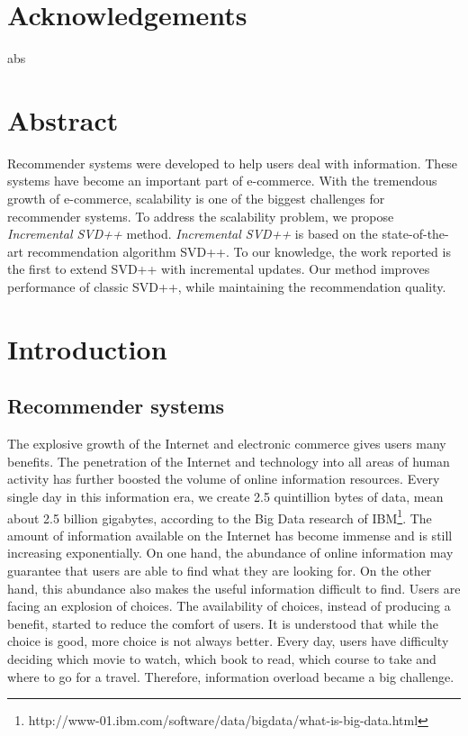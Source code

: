 \documentclass[oneside,13pt]{extreport}
\begin{document}
\clearpage
%
\chapter*{Acknowledgements}
\renewcommand{\thepage}{\roman{page}}
\setcounter{page}{1}

abs

\renewcommand\contentsname{Table of contents}
\tableofcontents
\clearpage

\listoffigures
 \clearpage
 
\listoftables
 

\chapter*{Abstract}
Recommender systems were developed to help users deal with information. These systems have become an important part of e-commerce. With the tremendous growth of e-commerce, scalability is one of the biggest challenges for recommender systems. 
To address the scalability problem, we propose \textit{Incremental SVD++} method. \textit{Incremental SVD++} is based on the state-of-the-art recommendation algorithm SVD++. To our knowledge, the work reported is the first to extend SVD++ with incremental updates. Our method improves performance of classic SVD++, while maintaining the recommendation quality.

\chapter{Introduction}
\renewcommand{\thepage}{\arabic{page}}
\setcounter{page}{1}
\section{Recommender systems}
The explosive growth  of the Internet and electronic commerce gives users many benefits. The penetration of the Internet and technology into all areas of human activity has further boosted the volume of online information resources. Every single day in this information era, we create 2.5 quintillion bytes of data, mean about 2.5 billion gigabytes, according to the Big Data research of IBM\footnote{http://www-01.ibm.com/software/data/bigdata/what-is-big-data.html}. The amount of information available on the Internet has become immense and is still increasing exponentially. On one hand, the abundance of online information may guarantee that users are able to find what they are looking for. On the other hand, this abundance also makes the useful information difficult to find. Users are facing an explosion of choices. The availability of choices, instead of producing a benefit, started to reduce the comfort of users. It is understood that while the choice is good, more choice is not always better. Every day, users have difficulty deciding which movie to watch, which book to read, which course to take and where to go for a travel. Therefore, information overload became a big challenge. 
\end{document}
